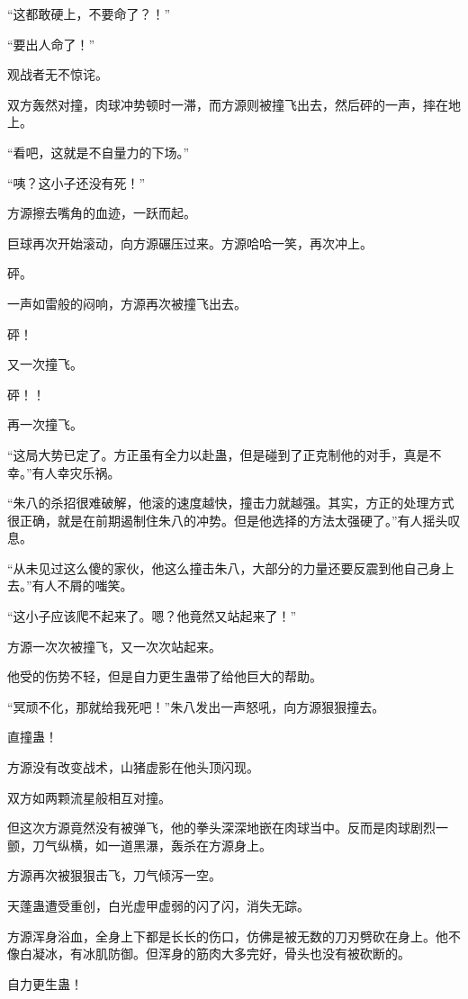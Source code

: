 \begin{this_body}
“这都敢硬上，不要命了？！”

“要出人命了！”

观战者无不惊诧。

双方轰然对撞，肉球冲势顿时一滞，而方源则被撞飞出去，然后砰的一声，摔在地上。

“看吧，这就是不自量力的下场。”

“咦？这小子还没有死！”

方源擦去嘴角的血迹，一跃而起。

巨球再次开始滚动，向方源碾压过来。方源哈哈一笑，再次冲上。

砰。

一声如雷般的闷响，方源再次被撞飞出去。

砰！

又一次撞飞。

砰！！

再一次撞飞。

“这局大势已定了。方正虽有全力以赴蛊，但是碰到了正克制他的对手，真是不幸。”有人幸灾乐祸。

“朱八的杀招很难破解，他滚的速度越快，撞击力就越强。其实，方正的处理方式很正确，就是在前期遏制住朱八的冲势。但是他选择的方法太强硬了。”有人摇头叹息。

“从未见过这么傻的家伙，他这么撞击朱八，大部分的力量还要反震到他自己身上去。”有人不屑的嗤笑。

“这小子应该爬不起来了。嗯？他竟然又站起来了！”

方源一次次被撞飞，又一次次站起来。

他受的伤势不轻，但是自力更生蛊带了给他巨大的帮助。

“冥顽不化，那就给我死吧！”朱八发出一声怒吼，向方源狠狠撞去。

直撞蛊！

方源没有改变战术，山猪虚影在他头顶闪现。

双方如两颗流星般相互对撞。

但这次方源竟然没有被弹飞，他的拳头深深地嵌在肉球当中。反而是肉球剧烈一颤，刀气纵横，如一道黑瀑，轰杀在方源身上。

方源再次被狠狠击飞，刀气倾泻一空。

天蓬蛊遭受重创，白光虚甲虚弱的闪了闪，消失无踪。

方源浑身浴血，全身上下都是长长的伤口，仿佛是被无数的刀刃劈砍在身上。他不像白凝冰，有冰肌防御。但浑身的筋肉大多完好，骨头也没有被砍断的。

自力更生蛊！


\end{this_body}

